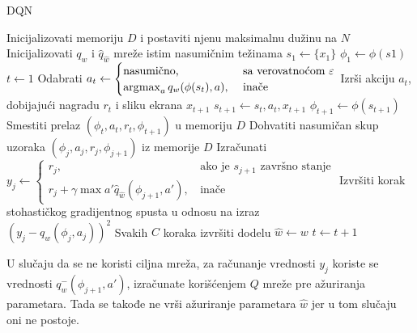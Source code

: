 \begin{myalgorithm}
\caption{DQN}\label{alg:dqn}
\begin{algorithmic}[0]
\Require
Inicijalizovati memoriju $D$ i postaviti njenu maksimalnu dužinu na $N$ \\ 
Inicijalizovati $q_w$ i $\hat{q}_{\hat{w}}$ mreže istim nasumičnim težinama 
	\State $s_1 \gets \{x_1\}$
	\State $\phi_1 \gets \phi(s1)$
	\State $t \gets 1$
	\Repeat
		\State Odabrati $a_t \gets
		\begin{cases} \text{nasumično, }&\text{~sa verovatnoćom~} \varepsilon  \\
                      \operatorname*{\arg\!\max}_a q_w(\phi(s_t), a)\text{,} &\text{~inače}
        \end{cases}$
		\State Izrši akciju $a_t$, dobijajući nagradu $r_t$ i sliku ekrana $x_{t+1}$
		\State $s_{t+1} \gets s_t, a_t, x_{t+1}$		
		\State $\phi_{t+1} \gets \phi(s_{t+1})$
		\State Smestiti prelaz $(\phi_t, a_t, r_t, \phi_{t+1})$ u memoriju $D$
		\State Dohvatiti nasumičan skup uzoraka $(\phi_j, a_j, r_j, \phi_{j+1})$ iz memorije $D$
		\State Izračunati 
		$y_j \gets \begin{cases} r_j\text{,~} & \text{ako je } s_{j+1} \text{ završno stanje}  \\
                      r_j + \gamma \max{a'} \hat{q}_{\hat{w}}(\phi_{j+1}, a')\text{,~} & \text{inače}
        \end{cases}$
        \State Izvršiti korak stohastičkog gradijentnog spusta u odnosu na izraz \\$(y_j - q_w(\phi_j, a_j))^2$
        \State Svakih $C$ koraka izvršiti dodelu $\hat{w} \gets w$
        \State $t \gets t+1$
\EndFor
\end{algorithmic}
\end{myalgorithm}

U slučaju da se ne koristi ciljna mreža, za računanje vrednosti $y_j$ koriste se vrednosti $q_w^-(\phi_{j+1}, a')$, izračunate korišćenjem $Q$ mreže pre ažuriranja parametara. Tada se takođe ne vrši ažuriranje parametara $\hat{w}$ jer u tom slučaju oni ne postoje.



